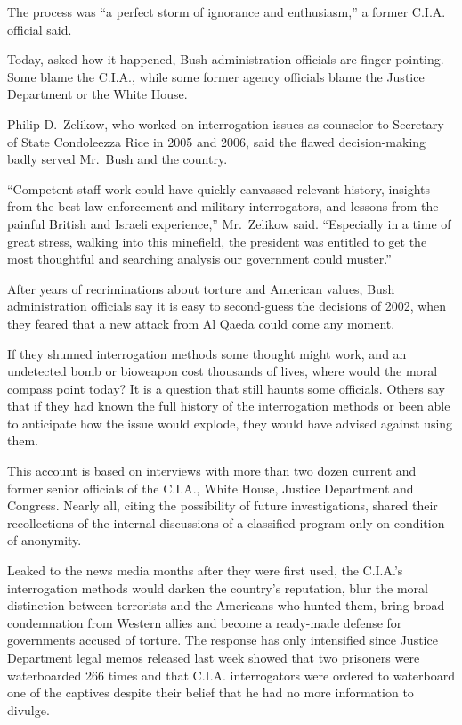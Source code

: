 \documentclass[12pt,a4paper,onecolumn]{article}
\begin{document}
The process was ``a perfect storm of ignorance and enthusiasm,'' a former C.I.A. official said.

Today, asked how it happened, Bush administration officials are finger-pointing. Some blame the
C.I.A., while some former agency officials blame the Justice Department or the White House.

Philip D.~Zelikow, who worked on interrogation issues as counselor to Secretary of State Condoleezza
Rice in 2005 and 2006, said the flawed decision-making badly served Mr.~Bush and the country.

``Competent staff work could have quickly canvassed relevant history, insights from the best law
enforcement and military interrogators, and lessons from the painful British and Israeli
experience,'' Mr.~Zelikow said. ``Especially in a time of great stress, walking into this minefield,
the president was entitled to get the most thoughtful and searching analysis our government could
muster.''

After years of recriminations about torture and American values, Bush administration officials say
it is easy to second-guess the decisions of 2002, when they feared that a new attack from Al Qaeda
could come any moment.

If they shunned interrogation methods some thought might work, and an undetected bomb or bioweapon
cost thousands of lives, where would the moral compass point today? It is a question that still
haunts some officials. Others say that if they had known the full history of the interrogation
methods or been able to anticipate how the issue would explode, they would have advised against
using them.

This account is based on interviews with more than two dozen current and former senior officials of
the C.I.A., White House, Justice Department and Congress. Nearly all, citing the possibility of
future investigations, shared their recollections of the internal discussions of a classified
program only on condition of anonymity.

Leaked to the news media months after they were first used, the C.I.A.'s interrogation methods would
darken the country's reputation, blur the moral distinction between terrorists and the Americans who
hunted them, bring broad condemnation from Western allies and become a ready-made defense for
governments accused of torture. The response has only intensified since Justice Department legal
memos released last week showed that two prisoners were waterboarded 266 times and that C.I.A.
interrogators were ordered to waterboard one of the captives despite their belief that he had no
more information to divulge.
\end{document}
